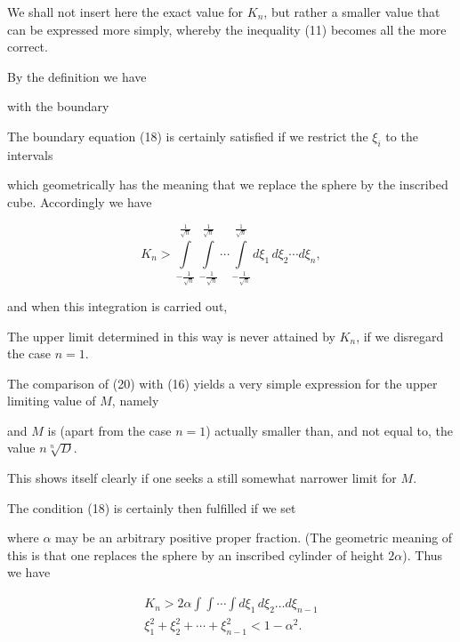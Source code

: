 We shall not insert here the exact value for $K_n$, but rather a
smaller value that can be expressed more simply, whereby the
inequality (11) becomes all the more correct.

By the definition we have


with the boundary


The boundary equation (18) is certainly satisfied if we restrict
the $\xi_i$ to the intervals


which geometrically has the meaning that we replace the sphere by
the inscribed cube. Accordingly we have

\[
K_n > \int\limits_{-\frac{1}{\sqrt n}}^{\frac{1}{\sqrt n}}
\int\limits_{-\frac{1}{\sqrt n}}^{\frac{1}{\sqrt n}}
\cdots
\int\limits_{-\frac{1}{\sqrt n}}^{\frac{1}{\sqrt n}}
d\xi_1\, d\xi_2 \cdots d\xi_n,
\]

and when this integration is carried out,


The upper limit determined in this way is never attained by $K_n$,
if we disregard the case $n = 1$.

The comparison of (20) with (16) yields a very simple expression
for the upper limiting value of $M$, namely


and $M$ is (apart from the case $n = 1$) actually smaller than, and
not equal to, the value $n \sqrt[n]{D}$.

This shows itself clearly if one seeks a still somewhat narrower
limit for $M$.

The condition (18) is certainly then fulfilled if we set


where $\alpha$ may be an arbitrary positive proper fraction.
(The geometric meaning of this is that one replaces the sphere
by an inscribed cylinder of height $2\alpha$). Thus we have

\[
\begin{gathered}
K_n > 2\alpha \int\!\int\!\cdots\!\int d\xi_1\, d\xi_2 \ldots d\xi_{n-1}\\
\xi_1^2 + \xi_2^2 + \cdots + \xi_{n-1}^2 < 1 - \alpha^2.
\end{gathered}
\]
